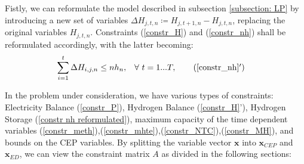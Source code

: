 Fistly, we can reformulate the model described in subsection \ref{subsection: LP} by introducing a new set of variables \(\Delta H_{j,t,n} \coloneqq H_{j,t+1,n} - H_{j,t,n}\), replacing the original variables \(H_{j,t,n}\). 
Constraints (\ref{constr_H}) and (\ref{constr_nh}) shall be reformulated accordingly, with the latter becoming:
\begin{align}
  \sum_{i=1}^{t} \Delta H_{i,j,n} \le nh_{n}, & \quad \forall\  t =1...T, \tag{\ref{constr_nh}$'$}\label{constr nh reformulated}
\end{align}

In the problem under consideration, we have various types of constraints: Electricity Balance (\ref{constr_P}), Hydrogen Balance (\ref{constr_H}'), Hydrogen Storage (\ref{constr nh reformulated}), maximum capacity of the time dependent variables (\ref{constr_meth}),(\ref{constr_mhte}),(\ref{constr_NTC}),(\ref{constr_MH}), and bounds on the CEP variables.
By splitting the variable vector $\mathbf{x}$ into $\mathbf{x}_{CEP}$ and $\mathbf{x}_{ED}$, we can view the constraint matrix $A$ as divided in the following sections:


